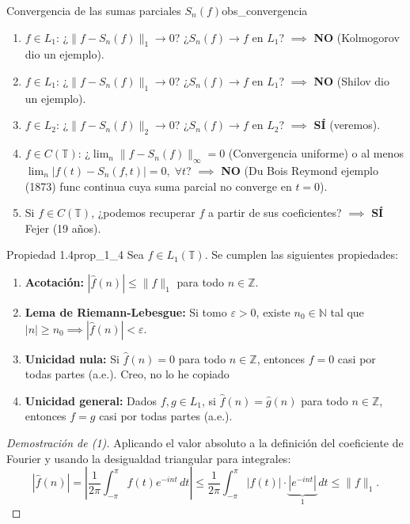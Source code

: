 \begin{observacion}{Convergencia de las sumas parciales $S_n(f)$}{obs_convergencia}
\begin{enumerate}
    \item [(1)]$f \in L_1$: ¿$\|f - S_n(f)\|_1 \to 0$? ¿$S_n(f) \to f$ en $L_1$? $\implies$ \textbf{NO} (Kolmogorov dio un ejemplo).
    \item[(2)] $f \in L_1$: ¿$\|f - S_n(f)\|_1 \to 0$? ¿$S_n(f) \to f$ en $L_1$? $\implies$ \textbf{NO} (Shilov dio un ejemplo).
    \item[(3)] $f \in L_2$: ¿$\|f - S_n(f)\|_2 \to 0$? ¿$S_n(f) \to f$ en $L_2$? $\implies$ \textbf{SÍ} (veremos).
    \item[(4)] $f \in C(\mathbb{T})$: ¿$\lim_n \|f - S_n(f)\|_\infty = 0$ (Convergencia uniforme) o al menos $\lim_n |f(t) - S_n(f, t)| = 0, \; \forall t$? $\implies$ \textbf{NO} (Du Bois Reymond ejemplo (1873) func continua cuya suma parcial no converge en $t = 0$).
    \item[(5)] Si $f \in C(\mathbb{T})$, ¿podemos recuperar $f$ a partir de sus coeficientes? $\implies$ \textbf{SÍ} Fejer (19 años).
\end{enumerate}
\end{observacion}

\begin{proposicion}{Propiedad 1.4}{prop_1_4}
Sea $f \in L_1(\mathbb{T})$. Se cumplen las siguientes propiedades:
\begin{enumerate}
    \item[(1)] \textbf{Acotación:} $|\hat{f}(n)| \le \|f\|_1$ para todo $n \in \mathbb{Z}$.
    \item[(2)] \textbf{Lema de Riemann-Lebesgue:} Si tomo $\varepsilon > 0$, existe $n_0 \in \mathbb{N}$ tal que $|n| \ge n_0 \implies |\hat{f}(n)| < \varepsilon$.
    \item[(3)] \textbf{Unicidad nula:} Si $\hat{f}(n) = 0$ para todo $n \in \mathbb{Z}$, entonces $f = 0$ casi por todas partes (a.e.). Creo, no lo he copiado
    \item[(4)] \textbf{Unicidad general:} Dados $f, g \in L_1$, si $\hat{f}(n) = \hat{g}(n)$ para todo $n \in \mathbb{Z}$, entonces $f = g$ casi por todas partes (a.e.).
\end{enumerate}
\end{proposicion}

\begin{proof}[Demostración de (1)]
Aplicando el valor absoluto a la definición del coeficiente de Fourier y usando la desigualdad triangular para integrales:
\[
|\hat{f}(n)| = \left| \frac{1}{2\pi} \int_{-\pi}^\pi f(t) e^{-i n t} \, dt \right| \le \frac{1}{2\pi} \int_{-\pi}^\pi |f(t)| \cdot \underbrace{|e^{-i n t}|}_{1} \, dt \le \|f\|_1.
\]
\end{proof}

